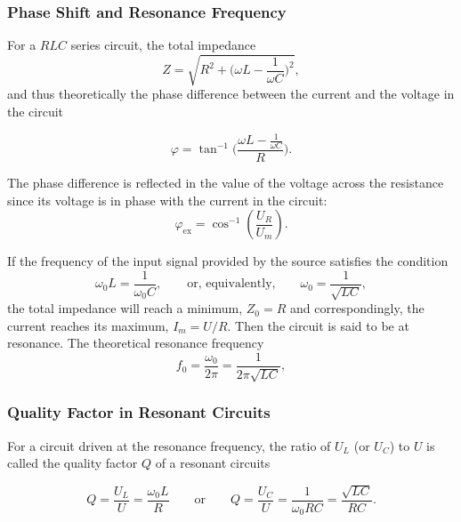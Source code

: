 \documentclass{article}
\begin{document}
\subsubsection{Phase Shift and Resonance Frequency}
For a $RLC$ series circuit, the total impedance
\begin{equation*}\label{EqZ}
    Z = \sqrt{R^2 + \bigg(\omega L - \frac{1}{\omega C}\bigg)^2},
\end{equation*}
and thus theoretically the phase difference between the current and the voltage in the circuit

\begin{equation}
    \varphi = \tan^{-1}\bigg(\frac{\omega L - \frac{1}{\omega C}}{R}\bigg).
    \label{eq:phitheo}
\end{equation}

The phase difference is reflected in the value of the voltage across the resistance since its voltage is in phase with the current in the circuit:
\begin{equation}
    \varphi_{\text{ex}} = \cos^{-1}(\frac{U_R}{U_m}).
    \label{eq:phiex}
\end{equation}

If the frequency of the input signal provided by the source satisfies the condition
$$\omega_0 L = \frac{1}{\omega_0 C}, \hspace{2em} \text{or, equivalently,} \hspace{2em} \omega_0 = \frac{1}{\sqrt{LC}},$$
the total impedance will reach a minimum, $Z_0 = R$ and correspondingly, the current reaches its maximum, $I_m = U/R$. Then the circuit is said to be at resonance. The theoretical resonance frequency
\begin{equation}
    f_0 = \frac{\omega_0}{2\pi} = \frac{1}{2\pi\sqrt{LC}},
    \label{eq:fres}
\end{equation}

\subsubsection{Quality Factor in Resonant Circuits}

For a circuit driven at the resonance frequency, the ratio of $U_L$ (or $U_C$) to $U$ is called the quality factor $Q$ of a resonant circuits

\begin{equation}
    Q = \frac{U_L}{U} = \frac{\omega_0 L}{R} \hspace{2em} \text{or} \hspace{2em} Q = \frac{U_C}{U} = \frac{1}{\omega_0 RC} =  \frac{\sqrt{LC}}{RC}.
    \label{eq:Qtheo}
\end{equation}
\end{document}
